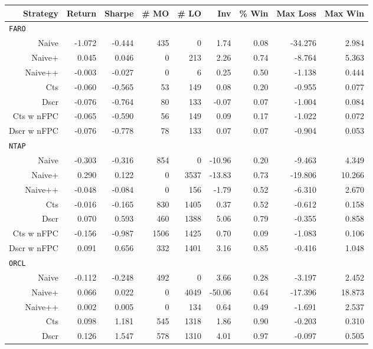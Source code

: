\begin{table}
\centering
{}
\begin{tabular}{@{} *{9}{r} @{}}
\toprule
Strategy & Return & Sharpe & \# MO & \# LO & Inv & \% Win & Max Loss & Max Win \\
\midrule
\multicolumn{9}{l}{\texttt{FARO}} \\ 
Naive & -1.072 & -0.444 & 435 & 0 & 1.74 & 0.08 & -34.276 & 2.984 \\ 
Naive+ & 0.045 & 0.046 & 0 & 213 & 2.26 & 0.74 & -8.764 & 5.363 \\ 
Naive++ & -0.003 & -0.027 & 0 & 6 & 0.25 & 0.50 & -1.138 & 0.444 \\ 
Cts & -0.060 & -0.565 & 53 & 149 & 0.08 & 0.20 & -0.955 & 0.077 \\ 
Dscr & -0.076 & -0.764 & 80 & 133 & -0.07 & 0.07 & -1.004 & 0.084 \\ 
Cts w nFPC & -0.065 & -0.590 & 56 & 149 & 0.09 & 0.17 & -1.022 & 0.072 \\ 
Dscr w nFPC & -0.076 & -0.778 & 78 & 133 & 0.07 & 0.07 & -0.904 & 0.053 \\[2ex]
\multicolumn{9}{l}{\texttt{NTAP}} \\ 
Naive & -0.303 & -0.316 & 854 & 0 & -10.96 & 0.20 & -9.463 & 4.349 \\ 
Naive+ & 0.290 & 0.122 & 0 & 3537 & -13.83 & 0.73 & -19.806 & 10.266 \\ 
Naive++ & -0.048 & -0.084 & 0 & 156 & -1.79 & 0.52 & -6.310 & 2.670 \\ 
Cts & -0.016 & -0.165 & 830 & 1405 & 0.37 & 0.52 & -0.612 & 0.158 \\ 
Dscr & 0.070 & 0.593 & 460 & 1388 & 5.06 & 0.79 & -0.355 & 0.858 \\ 
Cts w nFPC & -0.156 & -0.987 & 1506 & 1425 & 0.70 & 0.09 & -1.083 & 0.106 \\ 
Dscr w nFPC & 0.091 & 0.656 & 332 & 1401 & 3.16 & 0.85 & -0.416 & 1.048 \\[2ex]
\multicolumn{9}{l}{\texttt{ORCL}} \\ 
Naive & -0.112 & -0.248 & 492 & 0 & 3.66 & 0.28 & -3.197 & 2.452 \\ 
Naive+ & 0.066 & 0.022 & 0 & 4049 & -50.06 & 0.64 & -17.396 & 18.873 \\ 
Naive++ & 0.002 & 0.005 & 0 & 134 & 0.64 & 0.49 & -1.691 & 2.537 \\ 
Cts & 0.098 & 1.181 & 545 & 1318 & 1.86 & 0.90 & -0.203 & 0.310 \\ 
Dscr & 0.126 & 1.547 & 578 & 1310 & 4.01 & 0.97 & -0.097 & 0.505 \\ 

\end{tabular}
\end{table}
